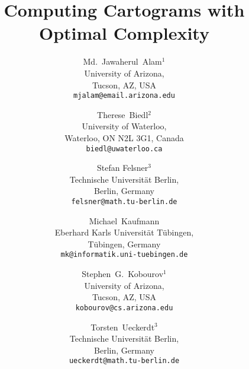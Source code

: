 \documentclass[11pt]{article}
\begin{document}
\addtocounter{page}{-1}

\title{\LARGE\bf Computing Cartograms with Optimal Complexity}


\author{
      \large Md.~Jawaherul~Alam$^1$\\[+1mm]
\sf    University of Arizona,\\
      \sf    Tucson, AZ, USA\\
        {\tt mjalam@email.arizona.edu}
\and
      \large Therese~Biedl$^2$\\[+1mm]
\sf    University of Waterloo,\\
      \sf    Waterloo, ON N2L 3G1, Canada\\
        {\tt biedl@uwaterloo.ca}
\and
      \large Stefan Felsner$^3$\\[+1mm]
\sf    Technische Universit\"at Berlin,\\
      \sf    Berlin, Germany\\
        {\tt felsner@math.tu-berlin.de}
\and
      \large Michael~Kaufmann\\[+1mm]
\sf    Eberhard Karls Universit\"at T\"ubingen,\\
      \sf    T\"ubingen, Germany\\
        {\tt mk@informatik.uni-tuebingen.de}
\and
      \large Stephen~G.~Kobourov$^1$\\[+1mm]
\sf    University of Arizona,\\
      \sf    Tucson, AZ, USA\\
        {\tt kobourov@cs.arizona.edu}
\and
      \large Torsten~Ueckerdt$^3$\\[+1mm]
\sf    Technische Universit\"at Berlin,\\
      \sf    Berlin, Germany\\
        {\tt ueckerdt@math.tu-berlin.de}
}
\date{}
\end{document}
